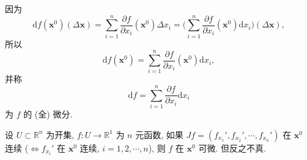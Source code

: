 \begin{remark}\label{rem:8.2.1}
因为
\[
  \mathrm{d}f(\boldsymbol{x}^{0})(\Delta\boldsymbol{x}) = \sum_{i=1}^{n}\frac{\partial f}{\partial x_{i}}(\boldsymbol{x}^{0})\Delta x_{i} = \Big(\sum_{i=1}^{n}\frac{\partial f}{\partial x_{i}}(\boldsymbol{x}^{0})\mathrm{d}x_{i}\Big)(\Delta\boldsymbol{x}),
\]
所以
\[
  \mathrm{d}f(\boldsymbol{x}^{0}) = \sum_{i=1}^{n}\frac{\partial f}{\partial x_{i}}(\boldsymbol{x}^{0})\mathrm{d}x_{i},
\]
并称
\[
  \mathrm{d}f = \sum_{i=1}^{n}\frac{\partial f}{\partial x_{i}}\mathrm{d}x_{i}
\]
为 $f$ 的 (全) 微分.
\end{remark}

\begin{theorem}[可微的充分条件]\label{thm:8.2.4}
设 $U \subset \mathbb{R}^{n}$ 为开集, $f: U \to \mathbb{R}^{1}$ 为 $n$ 元函数, 如果 $Jf = (f_{x_{1}}', f_{x_{2}}', \cdots, f_{x_{n}}')$ 在 $\boldsymbol{x}^{0}$ 连续 ($\Leftrightarrow f_{x_{i}}'$ 在 $\boldsymbol{x}^{0}$ 连续, $i = 1, 2, \cdots, n$), 则 $f$ 在 $\boldsymbol{x}^{0}$ 可微. 但反之不真.
\end{theorem}

